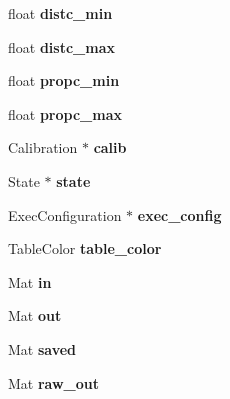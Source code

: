 \begin{DoxyCompactItemize}
\item 
float {\bfseries distc\+\_\+min}\hypertarget{classvision_a55d7e213d59603d7ac47a52b84109809}{}\label{classvision_a55d7e213d59603d7ac47a52b84109809}

\item 
float {\bfseries distc\+\_\+max}\hypertarget{classvision_a20c85db3ec02873d653e5bb9b10c39ff}{}\label{classvision_a20c85db3ec02873d653e5bb9b10c39ff}

\item 
float {\bfseries propc\+\_\+min}\hypertarget{classvision_a91f86b737be2111668b21ee63797f401}{}\label{classvision_a91f86b737be2111668b21ee63797f401}

\item 
float {\bfseries propc\+\_\+max}\hypertarget{classvision_a6aeb3bfbd1eebe0a8e1d722eb8c21891}{}\label{classvision_a6aeb3bfbd1eebe0a8e1d722eb8c21891}

\item 
Calibration $\ast$ {\bfseries calib}\hypertarget{classvision_a7e5420798a60cb8b48e8a29b786f1683}{}\label{classvision_a7e5420798a60cb8b48e8a29b786f1683}

\item 
State $\ast$ {\bfseries state}\hypertarget{classvision_a66846efba8a3de237d1a3c153ff1b812}{}\label{classvision_a66846efba8a3de237d1a3c153ff1b812}

\item 
Exec\+Configuration $\ast$ {\bfseries exec\+\_\+config}\hypertarget{classvision_a7929fc67b174048c25f34c064e6931ea}{}\label{classvision_a7929fc67b174048c25f34c064e6931ea}

\item 
Table\+Color {\bfseries table\+\_\+color}\hypertarget{classvision_a992a907eaa83feaa4fdec5eec0a3c978}{}\label{classvision_a992a907eaa83feaa4fdec5eec0a3c978}

\item 
Mat {\bfseries in}\hypertarget{classvision_a628e5f4db4cf2b380fa9849b1c7c6ede}{}\label{classvision_a628e5f4db4cf2b380fa9849b1c7c6ede}

\item 
Mat {\bfseries out}\hypertarget{classvision_a8e6f2872c854246898bdaf75db8bc219}{}\label{classvision_a8e6f2872c854246898bdaf75db8bc219}

\item 
Mat {\bfseries saved}\hypertarget{classvision_aaa8cc8d3f4860c2fe40b54d30ba3bb73}{}\label{classvision_aaa8cc8d3f4860c2fe40b54d30ba3bb73}

\item 
Mat {\bfseries raw\+\_\+out}\hypertarget{classvision_ae5f3eff88240c3cb76eb6b6018cc7fea}{}\label{classvision_ae5f3eff88240c3cb76eb6b6018cc7fea}


\end{DoxyCompactItemize}
